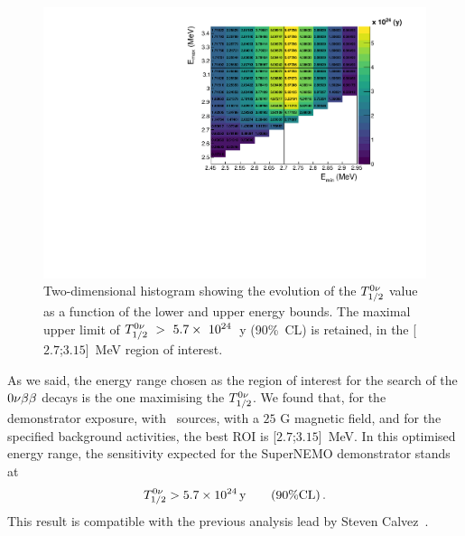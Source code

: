 \begin{figure}[h]
  \centering
  \includegraphics[width=1.1\textwidth]{Sensitivity/fig_sensitivity/sensitivity_spectrum_with_B_82Se.pdf}
  \caption{Two-dimensional histogram showing the evolution of the $T_{1/2}^{0\nu}$ value as a function of the lower and upper energy bounds.
    The maximal upper limit of $T_{1/2}^{0\nu}~>~5.7\times~10^{24}$~y (90\%~CL) is retained, in the [$2.7$;$3.15$]~MeV region of interest.
    \label{fig:sensitivity_cont}}
\end{figure}
As we said, the energy range chosen as the region of interest for the search of the $0\nu\beta\beta$ decays is the one maximising the $T_{1/2}^{0\nu}$.
We found that, for the demonstrator exposure, with \Se\ sources, with a $25$ G magnetic field, and for the specified background activities, the best ROI is [$2.7$;$3.15$]~MeV.
In this optimised energy range, the sensitivity expected for the SuperNEMO demonstrator stands at
\begin{equation}
T_{1/2}^{0\nu} > 5.7\times 10^{24}\,\text{y}\qquad (90\% \text{CL})\,.
\end{equation}
This result is compatible with the previous analysis lead by Steven Calvez~\cite{CalvezThesis}.


